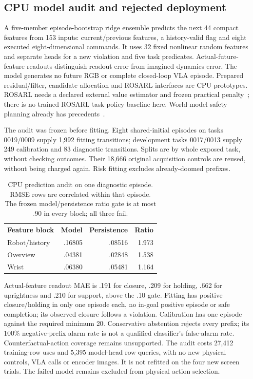 \subsection{CPU model audit and rejected deployment}
A five-member episode-bootstrap ridge ensemble predicts the next 44 compact
features from 153 inputs: current/previous features, a history-valid flag and
eight executed eight-dimensional commands. It uses 32 fixed nonlinear random
features and separate heads for a new violation and five task predicates.
Actual-future-feature readouts distinguish readout error from imagined-dynamics
error. The model generates no future RGB or complete closed-loop VLA episode.
Prepared residual/filter, candidate-allocation and ROSARL interfaces are CPU
prototypes. ROSARL needs a declared external value estimator and frozen practical
penalty~\cite{rosarl}; there is no trained ROSARL task-policy baseline here.
World-model safety planning already has precedents~\cite{safedreamer}.

The audit was frozen before fitting. Eight shared-initial episodes on tasks
0019/0009 supply 1,992 fitting transitions; development tasks 0017/0013 supply
249 calibration and 83 diagnostic transitions. Splits are by whole exposed task,
without checking outcomes. Their 18,666 original acquisition controls are reused,
without being charged again. Risk fitting excludes already-doomed prefixes.

\begin{table}[t]
\caption{CPU prediction audit on one diagnostic episode. RMSE rows are correlated
within that episode. The frozen model/persistence ratio gate is at most .90 in
every block; all three fail.}
\label{tab:model-audit}
\begin{tabular}{lrrr}
\toprule
Feature block & Model & Persistence & Ratio \\
\midrule
Robot/history & .16805 & .08516 & 1.973 \\
Overview & .04381 & .02848 & 1.538 \\
Wrist & .06380 & .05481 & 1.164 \\
\bottomrule
\end{tabular}
\end{table}

Actual-feature readout MAE is .191 for closure, .209 for holding, .662 for
uprightness and .210 for support, above the .10 gate. Fitting has positive
closure/holding in only one episode each, no in-goal positive episode or safe
completion; its observed closure follows a violation. Calibration has one episode
against the required minimum 20. Conservative abstention rejects every prefix;
its 100\% negative-prefix alarm rate is not a qualified classifier's false-alarm
rate. Counterfactual-action coverage remains unsupported. The audit costs 27,412
training-row uses and 5,395 model-head row queries, with no new physical controls,
VLA calls or encoder images. It is not refitted on the four new screen trials.
The failed model remains excluded from physical action selection.
